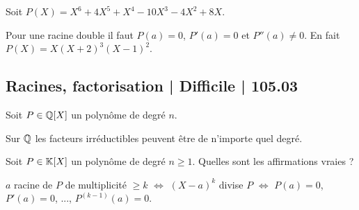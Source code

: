 \begin{question}
Soit $P(X) = X^6 + 4 X^5 + X^4 - 10 X^3 - 4 X^2 + 8 X$.
\begin{answers}



\end{answers}
\begin{explanations}
Pour une racine double il faut $P(a)=0$, $P'(a)=0$ et $P''(a)\neq0$.
En fait $P(X) = X(X+2)^3(X-1)^2$.
\end{explanations}
\end{question}




\subsection{Racines, factorisation | Difficile | 105.03}


\begin{question}
Soit $P \in \mathbb{Q}[X]$ un polynôme de degré $n$.
\begin{answers}



\end{answers}
\begin{explanations}
Sur $\mathbb{Q}$ les facteurs irréductibles peuvent être de n'importe quel degré.
\end{explanations}
\end{question}



\begin{question}
Soit $P \in \mathbb{K}[X]$ un polynôme de degré $n\ge1$.
Quelles sont les affirmations vraies ?
\begin{answers}

    

   
\end{answers}
\begin{explanations}
$a$ racine de $P$ de multiplicité $\ge k$ $\iff$ $(X-a)^k$ divise $P$ $\iff$ $P(a) = 0$, $P'(a)=0$, ..., $P^{(k-1)}(a)=0$.
\end{explanations}
\end{question}

